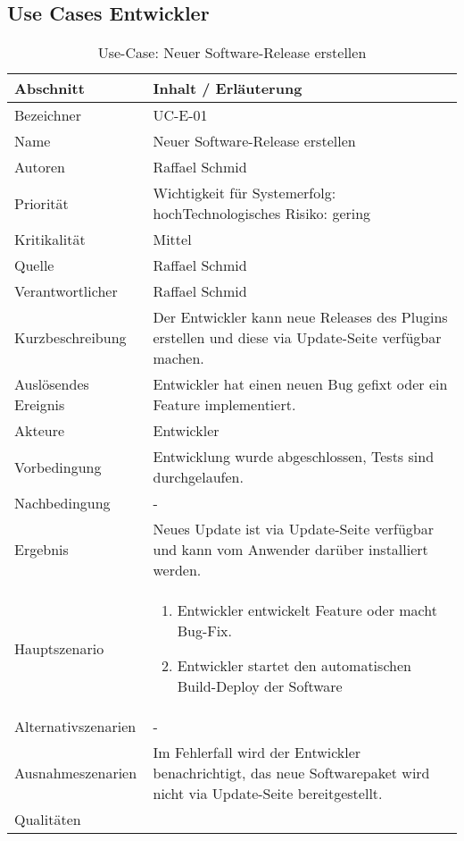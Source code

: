 \subsection{Use Cases Entwickler}
\begin{longtable}{|p{4cm}|p{10.5cm}|}
\caption{Use-Case: Neuer Software-Release erstellen}\\\hline
   \textbf{Abschnitt} & \textbf{Inhalt / Erläuterung} \\\hline
   Bezeichner & UC-E-01\\\hline
   Name & Neuer Software-Release erstellen\\\hline
   Autoren & Raffael Schmid\\\hline
   Priorität & Wichtigkeit für Systemerfolg: hoch\newline Technologisches Risiko: gering\\\hline
   Kritikalität & Mittel\\\hline
   Quelle & Raffael Schmid\\\hline
   Verantwortlicher & Raffael Schmid\\\hline
   Kurzbeschreibung & Der Entwickler kann neue Releases des Plugins erstellen und diese via Update-Seite verfügbar machen.\\\hline
   Auslösendes Ereignis & Entwickler hat einen neuen Bug gefixt oder ein Feature implementiert.\\\hline
   Akteure & Entwickler\\\hline
   Vorbedingung & Entwicklung wurde abgeschlossen, Tests sind durchgelaufen.\\\hline
   Nachbedingung & -\\\hline
   Ergebnis & Neues Update ist via Update-Seite verfügbar und kann vom Anwender darüber installiert werden.\\\hline
   Hauptszenario & 
	\begin{enumerate}
		\item Entwickler entwickelt Feature oder macht Bug-Fix.
		\item Entwickler startet den automatischen Build-Deploy der Software
	\end{enumerate}
	\\\hline
   Alternativszenarien & -\\\hline
   Ausnahmeszenarien & Im Fehlerfall wird der Entwickler benachrichtigt, das neue Softwarepaket wird nicht via Update-Seite bereitgestellt.\\\hline
   Qualitäten & \\\hline
\end{longtable}



